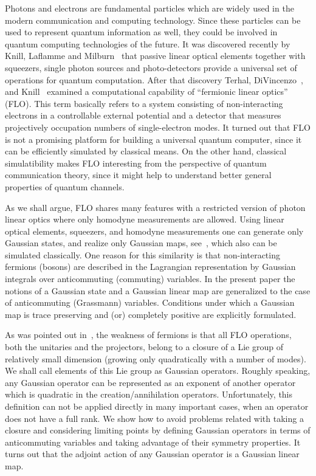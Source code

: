 \documentclass[twocolumn,showpacs,preprintnumbers,superscriptaddress]{revtex4}
\begin{document}
Photons and electrons are fundamental particles which are widely used
in the modern communication and computing technology.
Since these particles can be used to represent quantum information as well,
they could  be involved in  quantum computing technologies of the future.
It was discovered recently by Knill, Laflamme and
Milburn~\cite{KLM00} that passive linear optical elements together with squeezers,
single photon sources and photo-detectors provide a universal set of operations
for quantum computation. After that discovery Terhal, DiVincenzo~\cite{TV01}, and
Knill~\cite{Knill01} examined a computational capability of
``fermionic linear optics'' (FLO). This term basically refers to
a system consisting of non-interacting electrons in a controllable
external potential and a detector
that measures projectively occupation numbers of single-electron modes. 
It turned out that 
FLO is not a promising platform for building
a universal quantum computer, since it can be efficiently simulated by classical means.
On the other hand, classical simulatibility makes FLO
interesting from the perspective of quantum communication theory, since it might help
to understand better general properties of quantum channels.


As we shall argue, FLO shares many features with a restricted version 
of photon linear optics
where only homodyne measurements are allowed. Using linear optical elements,
squeezers, and homodyne measurements one can generate only Gaussian 
states, and realize only Gaussian maps, see~\cite{GC02}, which also
can be simulated classically. One reason for this similarity is that
non-interacting fermions (bosons) are described in the Lagrangian
representation by Gaussian integrals over anticommuting 
(commuting) variables.  In the present paper
the notions of a Gaussian state and a Gaussian linear map are
generalized to the case of anticommuting (Grassmann) variables.
Conditions under which a Gaussian map is trace preserving and (or) completely 
positive are explicitly formulated. 



As was pointed out in~\cite{Knill01}, the weakness of fermions is that all
FLO operations, both the unitaries
and the projectors, 
belong to a closure of a Lie group of relatively small
dimension (growing only quadratically with a number of modes).
We shall call elements of this Lie group
as Gaussian operators. Roughly speaking, any Gaussian operator can
be represented as an exponent of another operator which is quadratic in
the creation/annihilation operators.
 Unfortunately, this definition
can not be applied directly in many important cases, when an operator
does not have a full rank. 
We show how to avoid
problems related with taking a closure and considering
limiting points by defining Gaussian operators in terms of
anticommuting variables and taking advantage of their symmetry properties.
It turns out that the adjoint action of any Gaussian operator 
is a Gaussian linear map.
\end{document}
